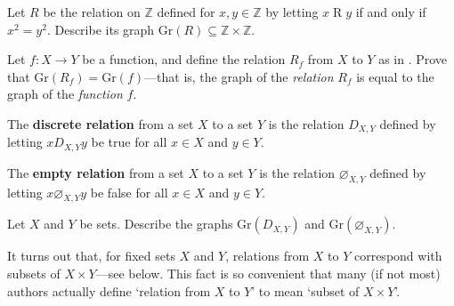 \begin{exercise}
Let $R$ be the relation on $\mathbb{Z}$ defined for $x,y \in \mathbb{Z}$ by letting $x \mathrel{R} y$ if and only if $x^2=y^2$. Describe its graph $\mathrm{Gr}(R) \subseteq \mathbb{Z} \times \mathbb{Z}$.
\end{exercise}

\begin{exercise}
Let $f : X \to Y$ be a function, and define the relation $R_f$ from $X$ to $Y$ as in . Prove that $\mathrm{Gr}(R_f) = \mathrm{Gr}(f)$---that is, the graph of the \textit{relation} $R_f$ is equal to the graph of the \textit{function} $f$.
\end{exercise}

\begin{definition}
\label{defEmptyRelation}
\label{defDiscreteRelation}
The \textbf{discrete relation} from a set $X$ to a set $Y$ is the relation $D_{X,Y}$ defined by letting $x \mathrel{D_{X,Y}} y$ be true for all $x \in X$ and $y \in Y$.

The \textbf{empty relation} from a set $X$ to a set $Y$ is the relation $\varnothing_{X,Y}$  defined by letting $x \mathrel{\varnothing_{X,Y}} y$ be false for all $x \in X$ and $y \in Y$.
\end{definition}

\begin{exercise}
\label{exGraphOfEmptyAndDiscreteRelations}
Let $X$ and $Y$ be sets. Describe the graphs $\mathrm{Gr}(D_{X,Y})$ and $\mathrm{Gr}(\varnothing_{X,Y})$.
\end{exercise}

It turns out that, for fixed sets $X$ and $Y$, relations from $X$ to $Y$ correspond with subsets of $X \times Y$---see  below. This fact is so convenient that many (if not most) authors actually define `relation from $X$ to $Y$' to mean `subset of $X \times Y$'.

